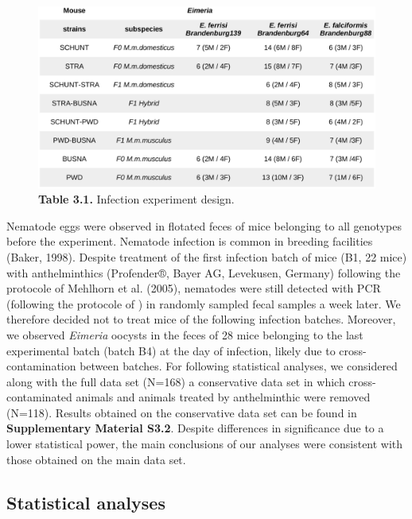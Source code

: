 \begin{figure}[H]
	\centering
	\includegraphics[width=\linewidth,height=\textheight,keepaspectratio]{images/3article2/Table1_final.pdf}
	\captionsetup{labelformat=empty}
	\caption{\textbf{Table 3.1.} Infection experiment design.}
\end{figure}
\addtocounter{figure}{-1}

Nematode eggs were observed in flotated feces of mice belonging to all genotypes before the experiment. Nematode infection is common in breeding facilities (Baker, 1998). Despite treatment of the first infection batch of mice (B1, 22 mice) with anthelminthics (Profender®, Bayer AG, Levekusen, Germany) following the protocole of Mehlhorn et al. (2005), nematodes were still detected with PCR (following the protocole of \cite{floyd_nematode-specific_2005}) in randomly sampled fecal samples a week later. We therefore decided not to treat mice of the following infection batches. Moreover, we observed \textit{Eimeria }oocysts in the feces of 28 mice belonging to the last experimental batch (batch B4) at the day of infection, likely due to cross-contamination between batches. For following statistical analyses, we considered along with the full data set (N=168) a conservative data set in which cross-contaminated animals and animals treated by anthelminthic were removed (N=118). Results obtained on the conservative data set can be found in \textbf{Supplementary Material S3.2}. Despite differences in significance due to a lower statistical power, the main conclusions of our analyses were consistent with those obtained on the main data set.\par

\subsection{Statistical analyses}

